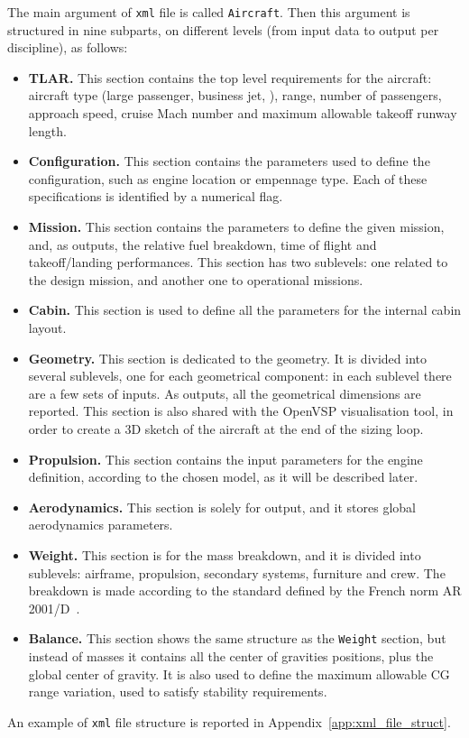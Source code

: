 The main argument of \texttt{xml} file is called \texttt{Aircraft}. 
Then this argument is structured in nine subparts, on different levels (from input data to output per discipline), as follows:
\begin{itemize}
	\item \textbf{TLAR.} This section contains the top level requirements for the aircraft: aircraft type (large passenger, business jet, \textellipsis), range, number of passengers, approach speed, cruise Mach number and maximum allowable takeoff runway length.
	
	\item \textbf{Configuration.} This section contains the parameters used to define the configuration, such as engine location or empennage type. Each of these specifications is identified by a numerical flag.
	
	\item \textbf{Mission.} This section contains the parameters to define the given mission, and, as outputs, the relative fuel breakdown, time of flight and takeoff/landing performances.
	This section has two sublevels: one related to the design mission, and another one to operational missions.
	
	\item \textbf{Cabin.} This section is used to define all the parameters for the internal cabin layout.
	
	\item \textbf{Geometry.} This section is dedicated to the geometry. 
	It is divided into several sublevels, one for each geometrical component: in each sublevel there are a few sets of inputs.
	As outputs, all the geometrical dimensions are reported. 
	This section is also shared with the OpenVSP visualisation tool, in order to create a 3D sketch of the aircraft at the end of the sizing loop.
	
	\item \textbf{Propulsion.} This section contains the input parameters for the engine definition, according to the chosen model, as it will be described later. 
	
	\item \textbf{Aerodynamics.} This section is solely for output, and it stores global aerodynamics parameters.
	
	\item \textbf{Weight.} This section is for the mass breakdown, and it is divided into sublevels: airframe, propulsion, secondary systems, furniture and crew. 
	The breakdown is made according to the standard defined by the French norm AR 2001/D~\cite{bib:mass_breakdown}.
	
	\item \textbf{Balance.} This section shows the same structure as the \texttt{Weight} section, but instead of masses it contains all the center of gravities positions, plus the global center of gravity. 
	It is also used to define the maximum allowable CG range variation, used to satisfy stability requirements.
\end{itemize}
An example of \texttt{xml} file structure is reported in Appendix~\ref{app:xml_file_struct}.

